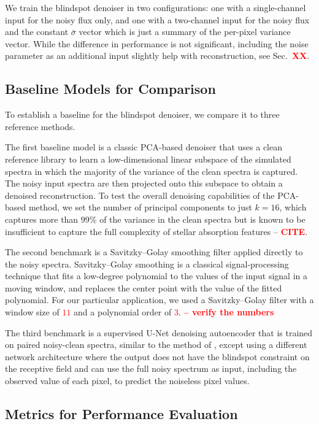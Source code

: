 \documentclass[twocolumn]{aastex7}
\newcommand{\ld}[1]{\textcolor{red}{\textbf{#1}}}
\begin{document}
We train the blindspot denoiser in two configurations: one with a single-channel input for the noisy flux only, and one with a two-channel input for the noisy flux and the constant $\bar{\sigma}$ vector which is just a summary of the per-pixel variance vector. While the difference in performance is not significant, including the noise parameter as an additional input slightly help with reconstruction, see Sec.~\ld{XX}.

\subsection{Baseline Models for Comparison}
\label{sec:baseline_models}

To establish a baseline for the blindspot denoiser, we compare it to three reference methods.

The first baseline model is a classic PCA-based denoiser that uses a clean reference library to learn a low-dimensional linear subspace of the simulated spectra in which the majority of the variance of the clean spectra is captured. The noisy input spectra are then projected onto this subspace to obtain a denoised reconstruction. To test the overall denoising capabilities of the PCA-based method, we set the number of principal components to just $k=16$, which captures more than $99\%$ of the variance in the clean spectra but is known to be insufficient to capture the full complexity of stellar absorption features -- \ld{CITE}.

The second benchmark is a Savitzky--Golay smoothing filter applied directly to the noisy spectra. Savitzky--Golay smoothing is a classical signal-processing technique that fits a low-degree polynomial to the values of the input signal in a moving window, and replaces the center point with the value of the fitted polynomial. For our particular application, we used a Savitzky--Golay filter with a window size of \ld{$11$} and a polynomial order of \ld{$3$}. \ld{-- verify the numbers}

The third benchmark is a supervised U-Net denoising autoencoder that is trained on paired noisy-clean spectra, similar to the method of \citet{Pal2024_denoising_autoencoder}, except using a different network architecture where the output does not have the blindspot constraint on the receptive field and can use the full noisy spectrum as input, including the observed value of each pixel, to predict the noiseless pixel values.

\subsection{Metrics for Performance Evaluation}
\label{sec:metrics}
\end{document}

